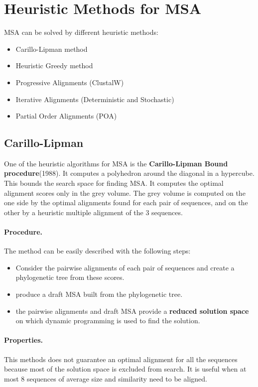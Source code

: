 \section{Heuristic Methods for MSA}
MSA can be solved by different heuristic methods:
\begin{itemize}
	\item Carillo-Lipman method
	\item Heuristic Greedy method
	\item Progressive Alignments (ClustalW)
	\item Iterative Alignments (Deterministic and Stochastic)
	\item Partial Order Alignments (POA)
\end{itemize}

\subsection{Carillo-Lipman}
One of the heuristic algorithms for MSA is the \textbf{Carillo-Lipman Bound procedure}(1988). It computes a polyhedron around the diagonal in a hypercube. This bounds the search space for finding MSA. It computes the optimal alignment scores only in the grey volume. 
The grey volume is computed on the one side by the optimal alignments found for each pair of sequences, and on the other by a heuristic multiple alignment of the 3 sequences.\\

\paragraph{Procedure.} The method can be easily described with the following steps:
\begin{itemize}
	\item Consider the pairwise alignments of each pair of sequences and create a phylogenetic tree from these scores.
	\item produce a draft MSA built from the phylogenetic tree.
	\item the pairwise alignments and draft MSA provide a \textbf{reduced solution space} on which dynamic programming is used to find the solution.
\end{itemize}

\paragraph{Properties.} This methods does not guarantee an optimal alignment for all the sequences because most of the solution space is excluded from search. It is useful when at most 8 sequences of average size and similarity need to be aligned.

